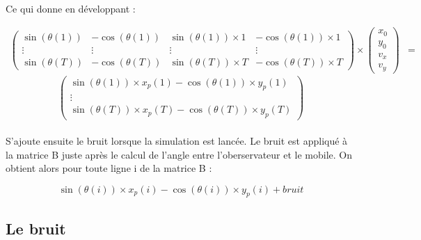 \documentclass[a4paper,11pt]{article}
\begin{document}
		\paragraph{}
		Ce qui donne en développant :

		\begin{equation}
				\begin{align*}
				\begin{pmatrix}
					\sin(\theta(1)) & -\cos(\theta(1))  & \sin(\theta(1))\times 1 & -\cos(\theta(1))\times 1  \\
					\vdots & \vdots  & \vdots & \vdots  \\
					\sin(\theta(T))  & -\cos(\theta(T))  &  \sin(\theta(T))\times T  &  -\cos(\theta(T))\times T
				\end{pmatrix}
				\times
				\begin{pmatrix}
				 x_0 \\
				 y_0 \\ 
				 v_x \\
				 v_y 
				\end{pmatrix}
				&= 
				\end{align*}
		\end{equation}
		\begin{equation*}
				\begin{pmatrix}
					\sin(\theta(1)) \times x_p(1) - \cos(\theta(1)) \times y_p(1)  \\
					\vdots \\
					\sin(\theta(T)) \times x_p(T) - \cos(\theta(T)) \times y_p(T)  
				\end{pmatrix}
		\end{equation*}

		
		\paragraph{}
		S'ajoute ensuite le bruit lorsque la simulation est lancée.
		Le bruit est appliqué à la matrice B juste après le calcul de l'angle entre l'oberservateur et le mobile. 
		On obtient alors pour toute ligne i de la matrice B :

			\begin{equation} 
				\sin(\theta(i)) \times x_p(i) - \cos(\theta(i)) \times y_p(i) + bruit
			\end{equation}
		
		\subsection{Le bruit}
\end{document}

